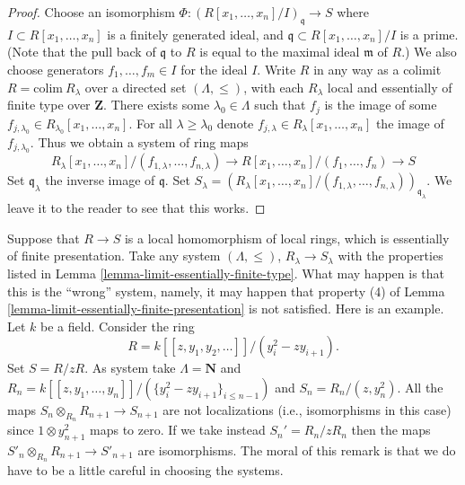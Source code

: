 \begin{proof}
Choose an isomorphism
$\Phi : (R[x_1, \ldots, x_n]/I)_{\mathfrak q} \to S$
where $I \subset R[x_1, \ldots, x_n]$ is a finitely generated ideal,
and $\mathfrak q \subset R[x_1, \ldots, x_n]/I$ is a prime.
(Note that the pull back of $\mathfrak q$ to $R$
is equal to the maximal ideal $\mathfrak m$ of $R$.)
We also choose generators $f_1, \ldots, f_m \in I$ for the ideal $I$.
Write $R$ in any way as a colimit $R = \text{colim}\ R_\lambda$
over a directed set $(\Lambda, \leq )$, with each $R_\lambda$
local and essentially of finite type over $\mathbf{Z}$.
There exists some $\lambda_0 \in \Lambda$ such that $f_j$ is the image
of some $f_{j, \lambda_0} \in R_{\lambda_0}[x_1, \ldots, x_n]$.
For all $\lambda \geq \lambda_0$ denote
$f_{j, \lambda} \in R_{\lambda}[x_1, \ldots, x_n]$ the image
of $f_{j, \lambda_0}$. Thus we obtain a system of ring maps
$$
R_\lambda[x_1, \ldots, x_n]/(f_{1, \lambda}, \ldots, f_{n, \lambda})
\to
R[x_1, \ldots, x_n]/(f_1, \ldots, f_n) \to S
$$
Set $\mathfrak q_\lambda$ the inverse image of $\mathfrak q$.
Set $S_\lambda = (R_\lambda[x_1, \ldots, x_n]/
(f_{1, \lambda}, \ldots, f_{n, \lambda}))_{\mathfrak q_\lambda}$.
We leave it to the reader to see that this works.
\end{proof}

\begin{remark}
\label{remark-suitable-systems-limits}
Suppose that $R \to S$ is a local homomorphism
of local rings, which is essentially of finite presentation.
Take any system $(\Lambda, \leq)$, $R_\lambda \to S_\lambda$
with the properties listed in
Lemma \ref{lemma-limit-essentially-finite-type}.
What may happen is that this is the ``wrong'' system, namely,
it may happen that property (4) of
Lemma \ref{lemma-limit-essentially-finite-presentation} is not
satisfied. Here is an example. Let $k$ be a field. Consider the ring
$$
R = k[[z, y_1, y_2, \ldots]]/(y_i^2 - zy_{i + 1}).
$$
Set $S = R/zR$. As system take $\Lambda = \mathbf{N}$ and
$R_n = k[[z, y_1, \ldots, y_n]]/(\{y_i^2 - zy_{i + 1}\}_{i \leq n-1})$
and $S_n = R_n/(z, y_n^2)$. All the maps
$S_n \otimes_{R_n} R_{n + 1} \to S_{n + 1}$
are not localizations (i.e., isomorphisms in this case)
since $1 \otimes y_{n + 1}^2$ maps to zero.
If we take instead $S_n' = R_n/zR_n$ then the
maps $S'_n \otimes_{R_n} R_{n + 1} \to S'_{n + 1}$ are
isomorphisms. The moral of this remark is that we do have to be
a little careful in choosing the systems.
\end{remark}

